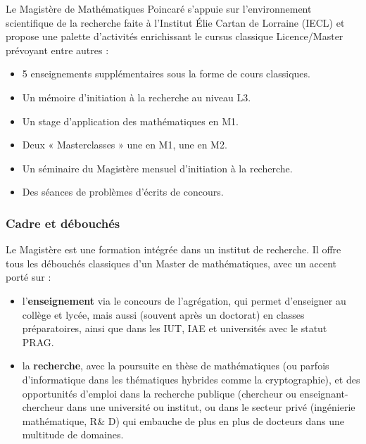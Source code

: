 \documentclass[slidetop,11pt]{beamer}
\begin{document}
\begin{frame}
Le Magistère de Mathématiques Poincaré s'appuie sur l'environnement scientifique de la recherche faite à l'Institut Élie Cartan de Lorraine (IECL) et propose une palette d'activités enrichissant le cursus classique Licence/Master prévoyant entre autres :
\begin{itemize}
\item 5 enseignements supplémentaires sous la forme de cours classiques.
\item Un mémoire d'initiation à la recherche au niveau L3.
\item Un stage d'application des mathématiques en M1.
\item Deux « Masterclasses » une en M1, une en M2.
\item Un séminaire du Magistère mensuel d'initiation à la recherche.
\item Des séances de problèmes d'écrits de concours.
\end{itemize}

\end{frame}


\begin{frame}
\frametitle{Cadre et débouchés}


Le Magistère est une formation intégrée dans un institut de recherche. 
Il offre tous les débouchés classiques d'un Master de mathématiques, avec un accent porté sur :
\begin{itemize}
\item l'\textbf{enseignement} via le concours de l'agrégation, qui permet d'enseigner au collège et lycée, mais aussi (souvent après un doctorat) en classes préparatoires, ainsi que dans les IUT, IAE et universités avec le statut PRAG.
\item la \textbf{recherche}, avec la poursuite en thèse de mathématiques (ou parfois d'informatique dans les thématiques hybrides comme la cryptographie), et des opportunités d'emploi dans la recherche publique (chercheur ou enseignant-chercheur dans une université ou institut, ou dans le secteur privé (ingénierie mathématique, R\& D) qui embauche de plus en plus de docteurs dans une multitude de domaines.
\end{itemize} 

\end{frame}
\end{document}
